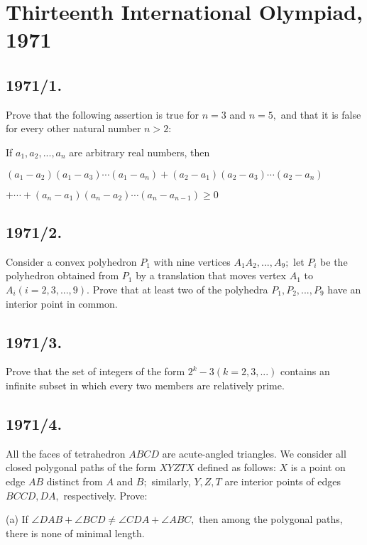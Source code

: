 \documentclass[12pt,thmsa]{article}
\begin{document}
\section{Thirteenth International Olympiad, 1971}

\subsection{1971/1.}

Prove that the following assertion is true for $n=3$ and $n=5,$ and that it
is false for every other natural number $n>2:$

If $a_{1},a_{2},...,a_{n}$ are arbitrary real numbers, then

$(a_{1}-a_{2})(a_{1}-a_{3})\cdots
(a_{1}-a_{n})+(a_{2}-a_{1})(a_{2}-a_{3})\cdots (a_{2}-a_{n})$

$+\cdots +(a_{n}-a_{1})(a_{n}-a_{2})\cdots (a_{n}-a_{n-1})\geq 0$

\subsection{1971/2.}

Consider a convex polyhedron $P_{1}$ with nine vertices $%
A_{1}A_{2},...,A_{9};$ let $P_{i}$ be the polyhedron obtained from $P_{1}$
by a translation that moves vertex $A_{1}$ to $A_{i}(i=2,3,...,9).$ Prove
that at least two of the polyhedra $P_{1},P_{2},...,P_{9}$ have an interior
point in common.

\subsection{1971/3.}

Prove that the set of integers of the form $2^{k}-3(k=2,3,...)$ contains an
infinite subset in which every two members are relatively prime.

\subsection{1971/4.}

All the faces of tetrahedron $ABCD$ are acute-angled triangles. We consider
all closed polygonal paths of the form $XYZTX$ defined as follows: $X$ is a
point on edge $AB$ distinct from $A$ and $B;$ similarly, $Y,Z,T$ are
interior points of edges $BCCD,DA,$ respectively. Prove:

(a) If $\angle DAB+\angle BCD\neq \angle CDA+\angle ABC,$ then among the
polygonal paths, there is none of minimal length.
\end{document}
